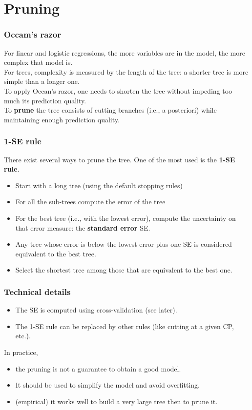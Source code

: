 \section{Pruning}
\begin{frame}
\frametitle{Occam's razor}
For linear and logistic regressions, the more variables are in the model, the more complex that model is.\\
\vspace{0.3cm}
For trees, complexity is measured by the length of the tree: a shorter tree is more simple than a longer one.\\
\vspace{0.3cm}
To apply Occan's razor, one needs to shorten the tree without impeding too much its prediction quality.\\
\vspace{0.3cm}
To {\bf prune} the tree consists of cutting branches (i.e., a posteriori) while maintaining enough prediction quality. 
\end{frame}
\begin{frame}
\frametitle{1-SE rule}
There exist several ways to prune the tree. One of the most used is the {\bf 1-SE rule}. 
\begin{itemize}
\item Start with a long tree (using the default stopping rules)
\item For all the sub-trees compute the error of the tree 
\item For the best tree (i.e., with the lowest error), compute the uncertainty on that error measure: the {\bf standard error} SE.
\item Any tree whose error is below the lowest error plus one SE is considered equivalent to the best tree.
\item Select the shortest tree among those that are equivalent to the best one.
\end{itemize}
\end{frame}
\begin{frame}
\frametitle{Technical details}
\begin{itemize}
\item The SE is computed using cross-validation (see later).
\item The 1-SE rule can be replaced by other rules (like cutting at a given CP, etc.). 
\end{itemize}
In practice, 
\begin{itemize}
\item the pruning is not a guarantee to obtain a good model. 
\item It should be used to simplify the model and avoid overfitting.
\item (empirical) it works well to build a very large tree then to prune it.
\end{itemize}
\end{frame}



